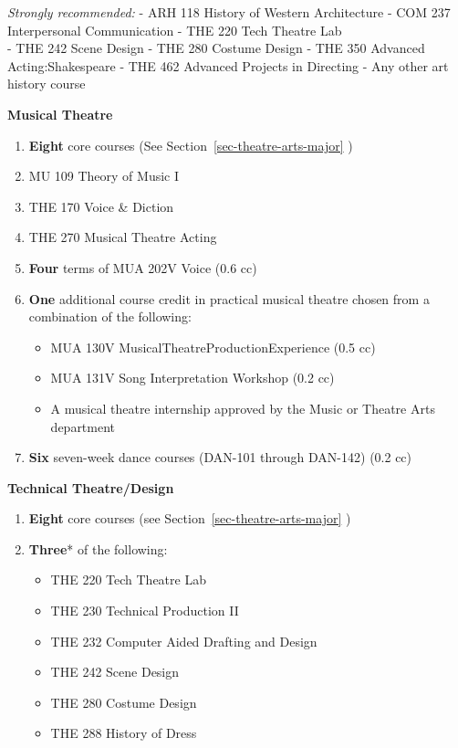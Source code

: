 \documentclass[
  letterpaper,
]{scrbook}
\providecommand{\tightlist}{%
  \setlength{\itemsep}{0pt}\setlength{\parskip}{0pt}}
\begin{document}
\emph{Strongly recommended:} - ARH 118 History of Western Architecture -
COM 237 Interpersonal Communication - THE 220 Tech Theatre Lab\\
- THE 242 Scene Design - THE 280 Costume Design - THE 350 Advanced
Acting:Shakespeare - THE 462 Advanced Projects in Directing - Any other
art history course

\textbf{Musical Theatre}

\begin{enumerate}
\def\labelenumi{\arabic{enumi}.}
\item
  \textbf{Eight} core courses (See Section~\ref{sec-theatre-arts-major}
  )
\item
  MU 109 Theory of Music I
\item
  THE 170 Voice \& Diction
\item
  THE 270 Musical Theatre Acting
\item
  \textbf{Four} terms of MUA 202V Voice (0.6 cc)
\item
  \textbf{One} additional course credit in practical musical theatre
  chosen from a combination of the following:

  \begin{itemize}
  \tightlist
  \item
    MUA 130V MusicalTheatreProductionExperience (0.5 cc)
  \item
    MUA 131V Song Interpretation Workshop (0.2 cc)
  \item
    A musical theatre internship approved by the Music or Theatre Arts
    department
  \end{itemize}
\item
  \textbf{Six} seven-week dance courses (DAN-101 through DAN-142) (0.2
  cc)
\end{enumerate}

\textbf{Technical Theatre/Design}

\begin{enumerate}
\def\labelenumi{\arabic{enumi}.}
\item
  \textbf{Eight} core courses (see Section~\ref{sec-theatre-arts-major}
  )
\item
  \textbf{Three}* of the following:

  \begin{itemize}
  \tightlist
  \item
    THE 220 Tech Theatre Lab
  \item
    THE 230 Technical Production II
  \item
    THE 232 Computer Aided Drafting and Design
  \item
    THE 242 Scene Design
  \item
    THE 280 Costume Design
  \item
    THE 288 History of Dress
  \end{itemize}
\end{enumerate}
\end{document}
